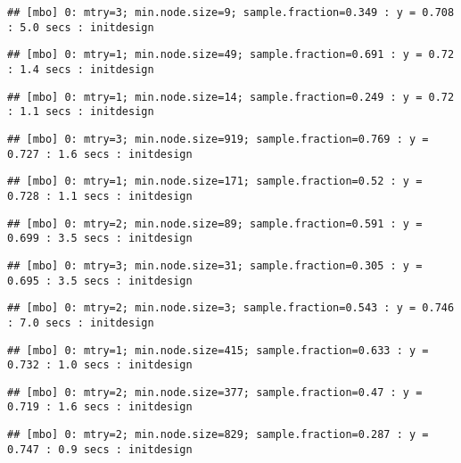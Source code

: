 \documentclass[
]{article}
\begin{document}
\begin{verbatim}
## [mbo] 0: mtry=3; min.node.size=9; sample.fraction=0.349 : y = 0.708 : 5.0 secs : initdesign
\end{verbatim}

\begin{verbatim}
## [mbo] 0: mtry=1; min.node.size=49; sample.fraction=0.691 : y = 0.72 : 1.4 secs : initdesign
\end{verbatim}

\begin{verbatim}
## [mbo] 0: mtry=1; min.node.size=14; sample.fraction=0.249 : y = 0.72 : 1.1 secs : initdesign
\end{verbatim}

\begin{verbatim}
## [mbo] 0: mtry=3; min.node.size=919; sample.fraction=0.769 : y = 0.727 : 1.6 secs : initdesign
\end{verbatim}

\begin{verbatim}
## [mbo] 0: mtry=1; min.node.size=171; sample.fraction=0.52 : y = 0.728 : 1.1 secs : initdesign
\end{verbatim}

\begin{verbatim}
## [mbo] 0: mtry=2; min.node.size=89; sample.fraction=0.591 : y = 0.699 : 3.5 secs : initdesign
\end{verbatim}

\begin{verbatim}
## [mbo] 0: mtry=3; min.node.size=31; sample.fraction=0.305 : y = 0.695 : 3.5 secs : initdesign
\end{verbatim}

\begin{verbatim}
## [mbo] 0: mtry=2; min.node.size=3; sample.fraction=0.543 : y = 0.746 : 7.0 secs : initdesign
\end{verbatim}

\begin{verbatim}
## [mbo] 0: mtry=1; min.node.size=415; sample.fraction=0.633 : y = 0.732 : 1.0 secs : initdesign
\end{verbatim}

\begin{verbatim}
## [mbo] 0: mtry=2; min.node.size=377; sample.fraction=0.47 : y = 0.719 : 1.6 secs : initdesign
\end{verbatim}

\begin{verbatim}
## [mbo] 0: mtry=2; min.node.size=829; sample.fraction=0.287 : y = 0.747 : 0.9 secs : initdesign
\end{verbatim}
\end{document}
